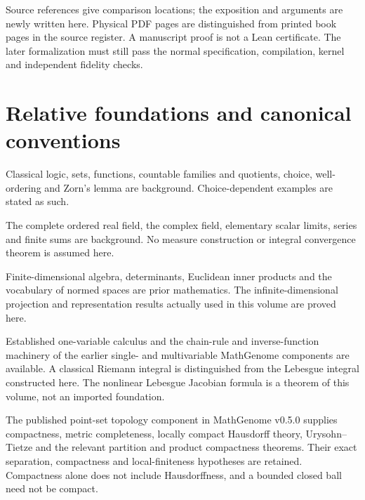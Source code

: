 \documentclass[11pt,oneside,openany]{book}
\theoremstyle{definition}
\theoremstyle{remark}
\newcounter{foundation}\renewcommand{\thefoundation}{F\arabic{foundation}}
\begin{document}
Source references give comparison locations; the exposition and arguments are
newly written here. Physical PDF pages are distinguished from printed book
pages in the source register. A manuscript proof is not a Lean certificate.
The later formalization must still pass the normal specification, compilation,
kernel and independent fidelity checks.


\tableofcontents

\chapter*{Relative foundations and canonical conventions}
\begin{description}[style=nextline,leftmargin=13mm]
\item[F\_SET]\label{base:d11-set}Classical logic, sets, functions, countable
families and quotients, choice, well-ordering and Zorn's lemma are background.
Choice-dependent examples are stated as such.
\item[F\_SCALAR]\label{base:d11-scalar}The complete ordered real field, the
complex field, elementary scalar limits, series and finite sums are background.
No measure construction or integral convergence theorem is assumed here.
\item[F\_LINEAR]\label{base:d11-linear}Finite-dimensional algebra,
determinants, Euclidean inner products and the vocabulary of normed spaces
are prior mathematics. The infinite-dimensional projection and representation
results actually used in this volume are proved here.
\item[F\_CALCULUS]\label{base:d11-calculus}Established one-variable
calculus and the chain-rule and inverse-function machinery of the earlier
single- and multivariable MathGenome components are available. A classical
Riemann integral is distinguished from the Lebesgue integral constructed here.
The nonlinear Lebesgue Jacobian formula is a theorem of this volume, not
an imported foundation.
\item[F\_TOPO]\label{base:d11-topology}The published point-set topology
component in MathGenome v0.5.0 supplies compactness, metric completeness,
locally compact Hausdorff theory, Urysohn--Tietze and the relevant partition
and product compactness theorems. Their exact separation, compactness and
local-finiteness hypotheses are retained. Compactness alone does not include
Hausdorffness, and a bounded closed ball need not be compact.
\end{description}
\end{document}
